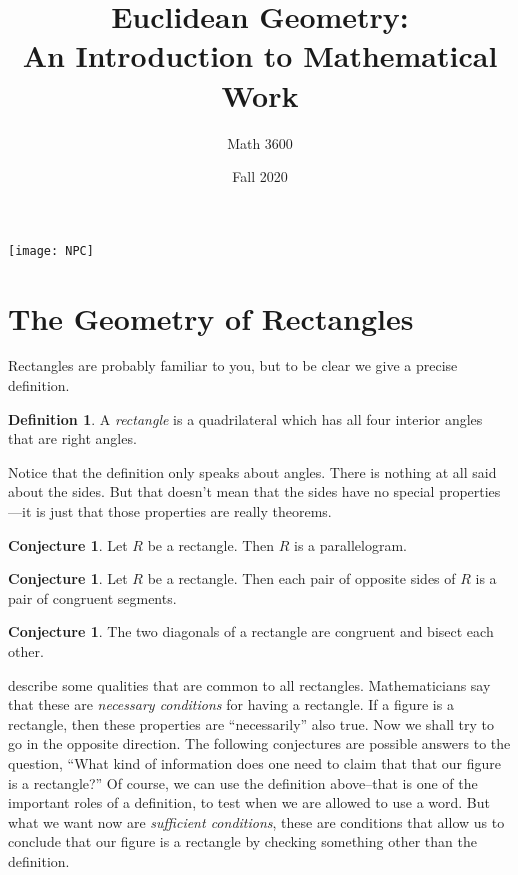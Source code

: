 \documentclass{tufte-handout}
\title{Euclidean Geometry:\\An Introduction to Mathematical Work}
\author[]{Math 3600}
\date{Fall 2020}
\theoremstyle{definition}
\newtheorem{conjecture}[problem]{Conjecture}
\newtheorem*{definition}{Definition}
\begin{document}
\maketitle
\begin{marginfigure}
    \texttt{[image: NPC]}
\end{marginfigure}

\setcounter{section}{3}
\section{The Geometry of Rectangles}\label{section:rectangles}

Rectangles are probably familiar to you, but to be clear we give a precise definition.
\begin{definition}\label{defn:rectangle}
A \emph{rectangle} is a quadrilateral which has all four interior angles that are right angles.
\end{definition}

Notice that the definition only speaks about angles. There is nothing at all said about the sides.
But that doesn't mean that the sides have no special properties---it is just that those properties are really theorems.

\begin{conjecture}\label{conj:rectangle-parallelogram}
Let $R$ be a rectangle. Then $R$ is a parallelogram.
\end{conjecture}

\begin{conjecture}\label{conj:rectangle-opp-sides}
Let $R$ be a rectangle. Then each pair of opposite sides of $R$ is a pair of congruent segments.
\end{conjecture}

\begin{conjecture}\label{conj:rectangle-diagonals}
The two diagonals of a rectangle are congruent and bisect each other.
\end{conjecture}

 describe some qualities that are common to all rectangles. Mathematicians say that these are \emph{necessary conditions} for having a rectangle.
If a figure is a rectangle, then these properties are ``necessarily'' also true. Now we shall try to go in the opposite direction.
The following conjectures are possible answers to the question, ``What kind of information does one need to claim that that our figure is a rectangle?''
Of course, we can use the definition above--that is one of the important roles of a definition, to test when we are allowed to use a word.
But what we want now are \emph{sufficient conditions}, these are conditions that allow us to conclude that our figure is a rectangle by checking something other than the definition.
\end{document}
